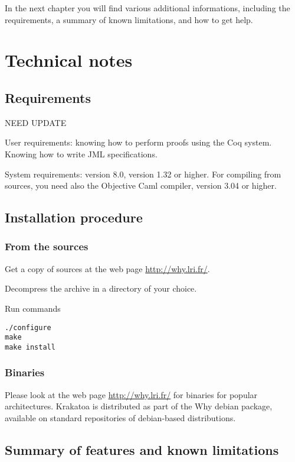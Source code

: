 \documentclass[a4paper,11pt,twoside,openright]{report}
\begin{document}
In the next chapter you will find various additional informations,
including the requirements, a summary of known limitations, and how to
get help. 


\chapter{Technical notes}

\section{Requirements}
\label{app:requirements}

NEED UPDATE

User requirements: knowing how to perform proofs using the Coq
system. Knowing how to write JML specifications.

System requirements: \Coq{} version 8.0, \Why{} version 1.32 or higher. For
compiling \Krakatoa{} from sources, you need also the Objective Caml
compiler, version 3.04 or higher.

\section{Installation procedure}

\subsection{From the sources}

Get a copy of sources at the web page \url{http://why.lri.fr/}. 

Decompress the archive in a directory of your choice.

Run commands
\begin{verbatim}
./configure
make
make install
\end{verbatim}

\subsection{Binaries}

Please look at the web page \url{http://why.lri.fr/} for binaries for
popular architectures. Krakatoa is distributed as part of the Why
debian package, available on standard repositories of debian-based
distributions.
 
\section{Summary of features and known limitations}
\label{sec:features}
\end{document}
